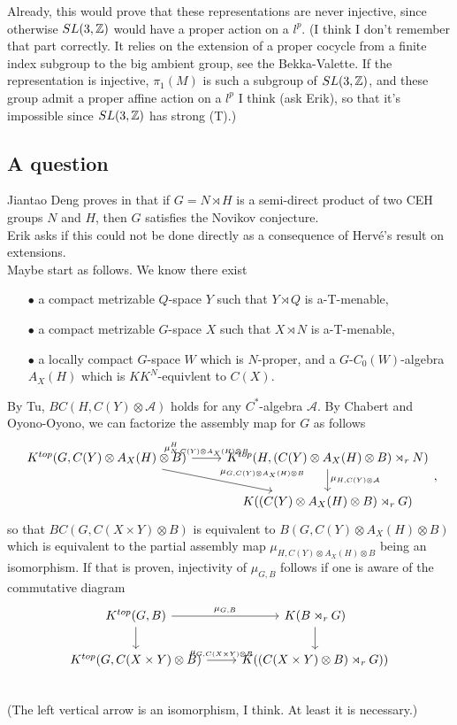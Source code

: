 Already, this would prove that these representations are never injective, since otherwise $SL(3,\mathbb Z)$ would have a proper action on a $l^p$. (I think I don't remember that part correctly. It relies on the extension of a proper cocycle from a finite index subgroup to the big ambient group, see the Bekka-Valette. If the representation is injective, $\pi_1(M)$ is such a subgroup of $SL(3,\mathbb Z)$, and these group admit a proper affine action on a $l^p$ I think (ask Erik), so that it's impossible since $SL(3,\mathbb Z)$ has strong (T).)

\subsection{A question}

Jiantao Deng proves in \cite{} that if $G= N \rtimes H$ is a semi-direct product of two CEH groups $N$ and $H$, then $G$ satisfies the Novikov conjecture. \\

Erik asks if this could not be done directly as a consequence of Herv\'e's result on extensions. \\

Maybe start as follows. We know there exist
\begin{itemize}
\item[$\bullet$] a compact metrizable $Q$-space $Y$ such that $Y\rtimes Q$ is a-T-menable,
\item[$\bullet$] a compact metrizable $G$-space $X$ such that $X\rtimes N$ is a-T-menable,
\item[$\bullet$] a locally compact $G$-space $W$ which is $N$-proper, and a $G$-$C_0(W)$-algebra $A_X(H)$ which is $KK^N$-equivlent to $C(X)$. 
\end{itemize}
By Tu, $BC(H, C(Y)\otimes\mathcal A)$ holds for any $C^*$-algebra $\mathcal A$. By Chabert and Oyono-Oyono, we can factorize the assembly map for $G$ as follows
\[\begin{tikzcd}
K^{top}(G, C(Y)\otimes A_X(H)\otimes B) \arrow{rd}{\mu_{G, C(Y)\otimes A_X(H)\otimes B}}\arrow{r}{\mu_{N,C(Y)\otimes A_X(H)\otimes B}^H} 
		& K^{top}(H, (C(Y)\otimes A_X(H)\otimes B)\rtimes_r N) \arrow{d}{\mu_{H , C(Y)\otimes \mathcal A}} \\
		& K((C(Y)\otimes A_X(H)\otimes B)\rtimes_r G)\end{tikzcd},\] 
so that $BC(G,C(X\times Y)\otimes B)$ is equivalent to $B(G, C(Y)\otimes A_X(H)\otimes B)$ which is equivalent to the partial assembly map $\mu_{H, C(Y)\otimes A_X(H)\otimes B}$ being an isomorphism. If that is proven, injectivity of $\mu_{G,B}$ follows if one is aware of the commutative diagram
\[\begin{tikzcd}
K^{top}(G,B)\arrow{d} \arrow{r}{\mu_{G,B}} & K(B\rtimes_r G) \arrow{d} \\
K^{top}(G, C(X\times Y)\otimes B) \arrow{r}{ \mu_{G,C(X\times Y)\otimes B} } & K( (C(X\times Y)\otimes B)\rtimes_r G)) \\
\end{tikzcd}\]
(The left vertical arrow is an isomorphism, I think. At least it is necessary.)

